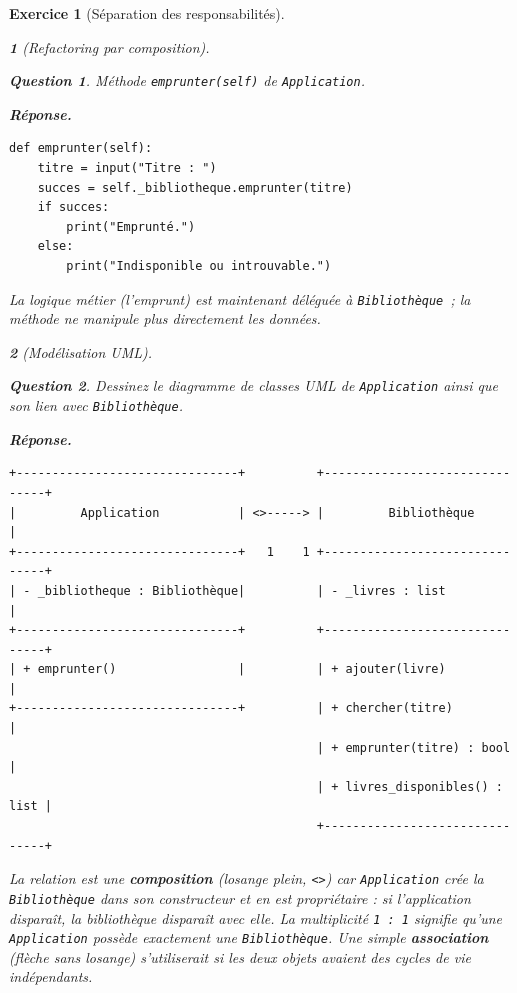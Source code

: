 \documentclass{article}
\theoremstyle{exostyle}
\newtheorem{exo}{Exercice}
\theoremstyle{partiestyle}
\newtheorem{partie}{}[exo]
\theoremstyle{questionstyle}
\newtheorem{questionpartie}{Question}[partie]
\newenvironment{reponse}{%
    \par\smallskip\noindent\textbf{Réponse.}\enspace\ignorespaces
}{%
    \par\smallskip
}
\begin{document}
\begin{exo}[Séparation des responsabilités]
\begin{partie}[Refactoring par composition]
        \begin{questionpartie}
            Méthode \texttt{emprunter(self)} de \texttt{Application}.
        \end{questionpartie}
        \begin{reponse}
\begin{lstlisting}
def emprunter(self):
    titre = input("Titre : ")
    succes = self._bibliotheque.emprunter(titre)
    if succes:
        print("Emprunté.")
    else:
        print("Indisponible ou introuvable.")
\end{lstlisting}
            La logique métier (l'emprunt) est maintenant déléguée à \texttt{Bibliothèque}~; la méthode ne manipule plus directement les données.
        \end{reponse}

    \end{partie}

    \begin{partie}[Modélisation UML]

        \begin{questionpartie}
            Dessinez le diagramme de classes UML de \texttt{Application} ainsi que son lien avec \texttt{Bibliothèque}.
        \end{questionpartie}
        \begin{reponse}
\begin{verbatim}
+-------------------------------+          +-------------------------------+
|         Application           | <>-----> |         Bibliothèque          |
+-------------------------------+   1    1 +-------------------------------+
| - _bibliotheque : Bibliothèque|          | - _livres : list              |
+-------------------------------+          +-------------------------------+
| + emprunter()                 |          | + ajouter(livre)              |
+-------------------------------+          | + chercher(titre)             |
                                           | + emprunter(titre) : bool     |
                                           | + livres_disponibles() : list |
                                           +-------------------------------+
\end{verbatim}
            La relation est une \textbf{composition} (losange plein, \texttt{<>}) car \texttt{Application} \textit{crée} la \texttt{Bibliothèque} dans son constructeur et en est propriétaire : si l'application disparaît, la bibliothèque disparaît avec elle. La multiplicité \texttt{1\,:\,1} signifie qu'une \texttt{Application} possède exactement une \texttt{Bibliothèque}. Une simple \textbf{association} (flèche sans losange) s'utiliserait si les deux objets avaient des cycles de vie indépendants.
        \end{reponse}


\end{partie}
\end{exo}
\end{document}
